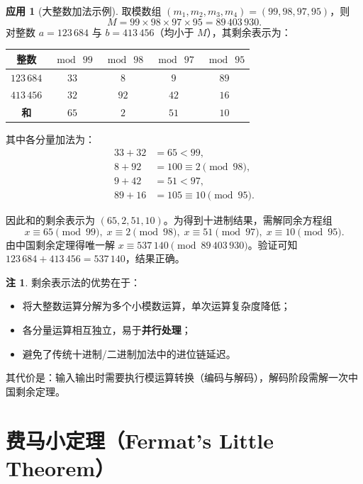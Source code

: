 \documentclass[UTF8,11pt,a4paper]{ctexbook}   %
\theoremstyle{definition}
\newtheorem{application}{应用}[section]
\newtheorem{remark}{注}[section]
\begin{document}
\begin{application}[大整数加法示例]
取模数组 $(m_1,m_2,m_3,m_4) = (99, 98, 97, 95)$，则
\[
M = 99 \times 98 \times 97 \times 95 = 89\,403\,930.
\]
对整数 $a = 123\,684$ 与 $b = 413\,456$（均小于 $M$），其剩余表示为：
\begin{table}[htbp]
\centering
\begin{tabular}{|c|c|c|c|c|}
\hline
\textbf{整数} & $\bmod\ 99$ & $\bmod\ 98$ & $\bmod\ 97$ & $\bmod\ 95$ \\
\hline
$123\,684$ & $33$ & $8$ & $9$ & $89$ \\
$413\,456$ & $32$ & $92$ & $42$ & $16$ \\
\hline
\textbf{和} & $65$ & $2$ & $51$ & $10$ \\
\hline
\end{tabular}
\end{table}

其中各分量加法为：
\begin{align*}
33+32 &= 65 < 99,\\
8+92 &= 100 \equiv 2 \pmod{98},\\
9+42 &= 51 < 97,\\
89+16 &= 105 \equiv 10 \pmod{95}.
\end{align*}

因此和的剩余表示为 $(65, 2, 51, 10)$。为得到十进制结果，需解同余方程组
\[
x \equiv 65 \pmod{99},\; x \equiv 2 \pmod{98},\; x \equiv 51 \pmod{97},\; x \equiv 10 \pmod{95}.
\]
由中国剩余定理得唯一解 $x \equiv 537\,140 \pmod{89\,403\,930}$。验证可知 $123\,684 + 413\,456 = 537\,140$，结果正确。
\end{application}

\begin{remark}
剩余表示法的优势在于：
\begin{itemize}
    \item 将大整数运算分解为多个小模数运算，单次运算复杂度降低；
    \item 各分量运算相互独立，易于\textbf{并行处理}；
    \item 避免了传统十进制/二进制加法中的进位链延迟。
\end{itemize}
其代价是：输入输出时需要执行模运算转换（编码与解码），解码阶段需解一次中国剩余定理。
\end{remark}

\section{费马小定理（Fermat's Little Theorem）}
\end{document}
